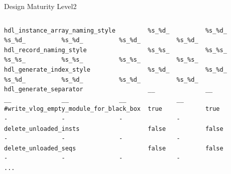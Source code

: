 \documentclass{beamer}
\begin{document}
\begin{frame}[fragile,plain,label=rc_attributes]{Design Maturity Level}{2}
\begin{columns}
\begin{column}{1.1\textwidth}
\begin{verbatim}
hdl_instance_array_naming_style         %s_%d_          %s_%d_          %s_%d_          %s_%d_          %s_%d_          %s_%d_
hdl_record_naming_style                 %s_%s_          %s_%s_          %s_%s_          %s_%s_          %s_%s_          %s_%s_
hdl_generate_index_style                %s_%d_          %s_%d_          %s_%d_          %s_%d_          %s_%d_          %s_%d_
hdl_generate_separator                  __              __              __              __              __              __
#write_vlog_empty_module_for_black_box  true            true            -               -               -               -
delete_unloaded_insts                   false           false           -               -               -               -
delete_unloaded_seqs                    false           false           -               -               -               -
...
\end{verbatim}
\end{column}
\end{columns}
\end{frame}
\end{document}
